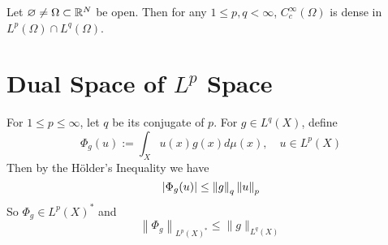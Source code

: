 \begin{thm}
	Let $\varnothing \neq \Omega \subset \mathbb{R}^N$ be open. Then for any $1 \leq p, q < \infty$, $C^\infty_c(\Omega)$ is dense in $L^p(\Omega) \cap L^q(\Omega)$.
\end{thm}

\section{Dual Space of \texorpdfstring{$L^p$}{Lp} Space}

For $1 \leq p \leq \infty$, let $q$ be its conjugate of $p$. For $g \in L^q(X)$, define
\begin{equation*}
	\Phi_g(u):=\int_X u(x) g(x) d \mu(x),\quad u \in L^p(X)
\end{equation*}
Then by the H\"older's Inequality we have
\begin{equation*}
	\left\lvert\Phi_g(u)\right\lvert \leq \left\lVert g\right\lVert_q\left\lVert u\right\lVert_p
\end{equation*}
So $\Phi_g \in L^p(X)^*$ and
\begin{equation*}
	\left\|\Phi_g\right\|_{L^p(X)^*} \leq\|g\|_{L^q(X)}
\end{equation*}

